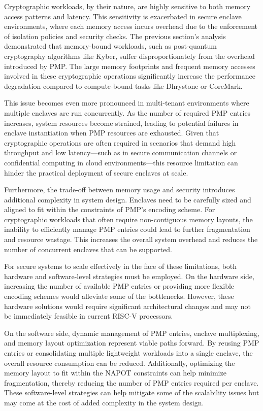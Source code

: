 Cryptographic workloads, by their nature, are highly sensitive to both memory access patterns and latency. This sensitivity is exacerbated in secure enclave environments, where each memory access incurs overhead due to the enforcement of isolation policies and security checks. The previous section's analysis demonstrated that memory-bound workloads, such as post-quantum cryptography algorithms like Kyber, suffer disproportionately from the overhead introduced by PMP. The large memory footprints and frequent memory accesses involved in these cryptographic operations significantly increase the performance degradation compared to compute-bound tasks like Dhrystone or CoreMark.

This issue becomes even more pronounced in multi-tenant environments where multiple enclaves are run concurrently. As the number of required PMP entries increases, system resources become strained, leading to potential failures in enclave instantiation when PMP resources are exhausted. Given that cryptographic operations are often required in scenarios that demand high throughput and low latency—such as in secure communication channels or confidential computing in cloud environments—this resource limitation can hinder the practical deployment of secure enclaves at scale.

Furthermore, the trade-off between memory usage and security introduces additional complexity in system design. Enclaves need to be carefully sized and aligned to fit within the constraints of PMP's encoding scheme. For cryptographic workloads that often require non-contiguous memory layouts, the inability to efficiently manage PMP entries could lead to further fragmentation and resource wastage. This increases the overall system overhead and reduces the number of concurrent enclaves that can be supported. 

For secure systems to scale effectively in the face of these limitations, both hardware and software-level strategies must be employed. On the hardware side, increasing the number of available PMP entries or providing more flexible encoding schemes would alleviate some of the bottlenecks. However, these hardware solutions would require significant architectural changes and may not be immediately feasible in current RISC-V processors. 

On the software side, dynamic management of PMP entries, enclave multiplexing, and memory layout optimization represent viable paths forward. By reusing PMP entries or consolidating multiple lightweight workloads into a single enclave, the overall resource consumption can be reduced. Additionally, optimizing the memory layout to fit within the NAPOT constraints can help minimize fragmentation, thereby reducing the number of PMP entries required per enclave. These software-level strategies can help mitigate some of the scalability issues but may come at the cost of added complexity in the system design.

